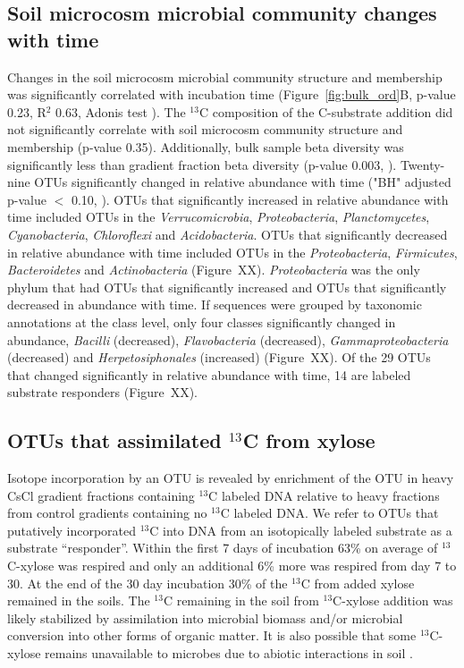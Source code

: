 \subsection{Soil microcosm microbial community changes with time}
Changes in the soil microcosm microbial community structure and membership was
significantly
correlated with incubation time (Figure~\ref{fig:bulk_ord}B, p-value 0.23,
R$^{2}$ 0.63, Adonis test \citet{Anderson2001a}). The $^{13}$C composition
of the C-substrate addition did not significantly correlate with soil microcosm
community structure and membership (p-value 0.35). Additionally, bulk sample
beta diversity was significantly less than gradient fraction beta diversity
(p-value 0.003, \citet{Anderson2006}). Twenty-nine OTUs significantly changed
in relative abundance with time ("BH" adjusted p-value $<$ 0.10,
\citet{YBenjamini1995}).  OTUs that significantly increased in relative
abundance with time included OTUs in the \textit{Verrucomicrobia},
\textit{Proteobacteria}, \textit{Planctomycetes}, \textit{Cyanobacteria},
\textit{Chloroflexi} and \textit{Acidobacteria}. OTUs that significantly
decreased in relative abundance with time included OTUs in the
\textit{Proteobacteria}, \textit{Firmicutes}, \textit{Bacteroidetes} and
\textit{Actinobacteria} (Figure~XX).  \textit{Proteobacteria} was the only
phylum that had OTUs that significantly increased and OTUs that significantly
decreased in abundance with time. If sequences were grouped by taxonomic
annotations at the class level, only four classes significantly changed in
abundance, \textit{Bacilli} (decreased), \textit{Flavobacteria} (decreased),
\textit{Gammaproteobacteria} (decreased) and \textit{Herpetosiphonales}
(increased) (Figure~XX). Of the 29 OTUs that changed significantly in relative
abundance with time, 14 are labeled substrate responders (Figure~XX).

\subsection{OTUs that assimilated $^{13}$C from xylose}
Isotope incorporation by an OTU is revealed by enrichment of the OTU in heavy
CsCl gradient fractions containing $^{13}$C labeled DNA relative to heavy
fractions from control gradients containing no $^{13}$C labeled DNA. We refer
to OTUs that putatively incorporated $^{13}$C into DNA from an isotopically
labeled substrate as a substrate ``responder''.  Within the first 7 days of
incubation 63\% on average of $^{13}$C-xylose was respired and only an
additional 6\% more was respired from day 7 to 30. At the end of the 30 day
incubation 30\% of the $^{13}$C from added xylose remained in the soils. The
$^{13}$C remaining in the soil from $^{13}$C-xylose addition was likely
stabilized by assimilation into microbial biomass and/or microbial conversion
into other forms of organic matter. It is also possible that some
$^{13}$C-xylose remains unavailable to microbes due to abiotic interactions in
soil \citep{Kalbitz_2000}. 

